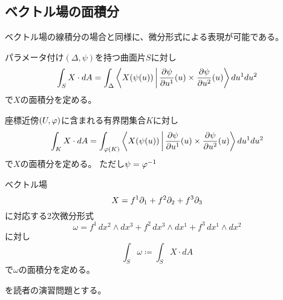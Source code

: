 \documentclass[report]{jlreq}
\begin{document}
\subsection{ベクトル場の面積分}

ベクトル場の線積分の場合と同様に、微分形式による表現が可能である。

\begin{definition}
    パラメータ付け$(\Delta, \psi)$を持つ曲面片$S$に対し
    \begin{equation}
        \int_S X \cdot dA = \int_{\Delta} \left\langle X(\psi(u)) \,\middle|\,
            \deldel[\psi]{u^1} (u) \times \deldel[\psi]{u^2} (u)
            \right\rangle du^1 du^2
    \end{equation}
    で$X$の面積分を定める。
\end{definition}

\begin{definition}
    座標近傍$(U, \varphi)$に含まれる有界閉集合$K$に対し
    \begin{equation}
        \int_K X \cdot dA = \int_{\phai(K)} \left\langle X(\psi(u)) \,\middle|\,
            \deldel[\psi]{u^1} (u) \times \deldel[\psi]{u^2} (u)
            \right\rangle du^1 du^2 
    \end{equation}
    で$X$の面積分を定める。
    ただし$\psi = \varphi^{-1}$
\end{definition}

\begin{definition}[微分形式による表現]
    ベクトル場
    \begin{equation}
        X = f^1 \partial_1 + f^2 \partial_2 + f^3 \partial_3
    \end{equation}
    に対応する2次微分形式
    \begin{equation}
        \omega
            = f^1\, dx^2 \wedge dx^3
            + f^2\, dx^3 \wedge dx^1
            + f^3\, dx^1 \wedge dx^2
    \end{equation}
    に対し
    \begin{equation}
        \int_S \omega
            \coloneqq \int_S X \cdot dA
    \end{equation}
    で$\omega$の面積分を定める。
\end{definition}

\begin{problem}[曲面片の表面積]
    \cite[第IV章 問題6.1 (1)-(5)]{杉浦+89}を読者の演習問題とする。
\end{problem}
\end{document}
